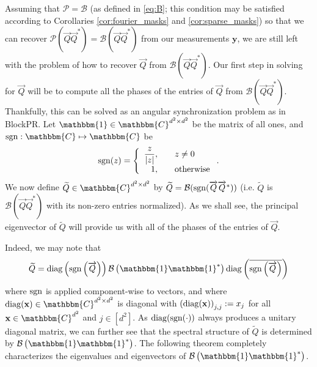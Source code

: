 \documentclass[]{spie}  %
\def \vec{\overrightarrow}
\def \x {\mathbf x}
\def \y {\mathbf y}
\def \P {\mathcal{P}}
\def \B {\mathcal{B}}
\def \one { \mathbbm{1}}
\def \sgn {{\rm sgn}}
\def \diag {{\rm diag}}
\begin{document}
Assuming that $\P = \B$ (as defined in \eqref{eq:B}; this condition may be satisfied according to Corollaries \ref{cor:fourier_masks} and \ref{cor:sparse_masks}) so that we can recover $\P ( \vec{Q} \vec{Q}^* ) = \B ( \vec{Q} \vec{Q}^* )$ from our measurements $\y$, we are still left with the problem of how to recover $\vec{Q}$ from $\B ( \vec{Q} \vec{Q}^* )$.  Our first step in solving for $\vec{Q}$ will be to compute all the phases of the entries of $\vec{Q}$ from $\B(\vec{Q} \vec{Q}^*)$.  Thankfully, this can be solved as an angular synchronization problem\cite{singer2011angular} as in BlockPR.\cite{viswanathana2015fast,iwen2016phase}  Let $\one \in \mathbbm{C}^{d^2 \times d^2}$ be the matrix of all ones, and $\sgn: \mathbbm{C} \mapsto  \mathbbm{C}$ be 
$$\sgn(z) = \left\{\begin{array}{r@{,\qquad}l} \dfrac{z}{|z|} & z \neq 0 \\ 1 & \text{otherwise} \end{array}\right..$$
We now define $\widetilde{Q} \in \mathbbm{C}^{d^2 \times d^2}$ by $\widetilde{Q} = \B(\sgn(\vec{Q} \vec{Q}^*))$ (i.e. $\widetilde{Q}$ is $\B(\vec{Q}\vec{Q}^*)$ with its non-zero entries normalized). %
As we shall see, the principal eigenvector of $\widetilde{Q}$ will provide us with all of the phases of the entries of $\vec{Q}$.

Indeed, we may note that
\begin{equation}
\widetilde{Q} = \diag \left( \sgn \left( \vec{Q} \right) \right) \B \left( \one \one^* \right) \diag \left( \overline{\sgn \left( \vec{Q} \right)} \right)
\label{equ:Qtilde_partial_factor}
\end{equation}
where $\sgn$ is applied component-wise to vectors, and where $\diag(\x)  \in \mathbbm{C}^{d^2 \times d^2}$ is diagonal with $\left(\diag(\x)\right)_{j,j} := x_j$ for all $\x \in \mathbbm{C}^{d^2}$ and $j \in [d^2]$.  As $\diag(\sgn(\cdot))$ always produces a unitary diagonal matrix, we can further see that the spectral structure of $\widetilde{Q}$ is determined by $\B \left( \one \one^* \right)$.  The following theorem completely characterizes the eigenvalues and eigenvectors of $\B \left( \one \one^* \right)$.
\end{document}
